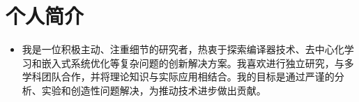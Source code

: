 \section{个人简介}
  \begin{itemize}[leftmargin=*]
    \item\small{我是一位积极主动、注重细节的研究者，热衷于探索编译器技术、去中心化学习和嵌入式系统优化等复杂问题的创新解决方案。我喜欢进行独立研究，与多学科团队合作，并将理论知识与实际应用相结合。我的目标是通过严谨的分析、实验和创造性问题解决，为推动技术进步做出贡献。}
  \end{itemize}